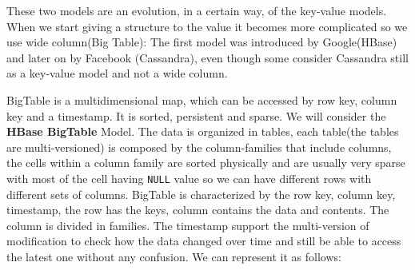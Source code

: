 \documentclass[a4page, 11pt]{article}
\begin{document}
These two models are an evolution, in a certain way, of the key-value models. When we start giving a structure to the value it becomes more complicated so we use wide column(Big Table): The first model was introduced by Google(HBase) and later on by Facebook (Cassandra), even though some consider Cassandra still  as a key-value model and not a wide column.

BigTable is a multidimensional map, which can be accessed by row key, column key and a timestamp. It is sorted, persistent and sparse.
We will consider the \textbf{HBase BigTable} Model.
The data is organized in tables, each table(the tables are multi-versioned) is composed by the column-families that include columns, the cells within a column family are sorted physically and are usually very sparse with most of the cell having \texttt{NULL} value so we can have different rows with different sets of columns. 
BigTable is characterized by the row key, column key, timestamp, the row has the keys, column contains the data and contents. 
The column is divided in families. The timestamp support the multi-version of modification to check how the data changed over time and still be able to access the latest one without any confusion. We can represent it as follows:
\end{document}
